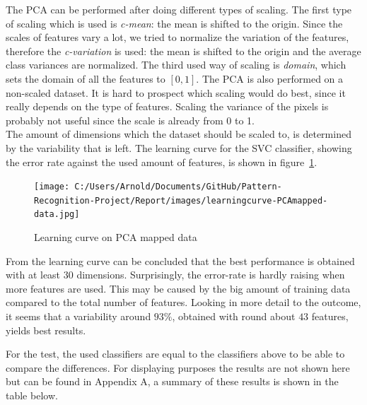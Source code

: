 \documentclass{article}
\begin{document}
The PCA can be performed after doing different types of scaling. The first type of scaling which is used is \emph{c-mean}: the mean is shifted to the origin. Since the scales of features vary a lot, we tried to normalize the variation of the features, therefore the \emph{c-variation} is used: the mean is shifted to the origin and the average class variances are normalized. The third used way of scaling is \emph{domain}, which sets the domain of all the features to $[0, 1]$. The PCA is also performed on a non-scaled dataset. It is hard to prospect which scaling would do best, since it really depends on the type of features. Scaling the variance of the pixels is probably not useful since the scale is already from 0 to 1. \\

The amount of dimensions which the dataset should be scaled to, is determined by the variability that is left. The learning curve for the SVC classifier, showing the error rate against the used amount of features, is shown in figure~\ref{fig:learningcurve-PCAmapped-data}.

\begin{figure}[H]
	\centering
		\texttt{[image: C:/Users/Arnold/Documents/GitHub/Pattern-Recognition-Project/Report/images/learningcurve-PCAmapped-data.jpg]}
	\caption{Learning curve on PCA mapped data}
	\label{fig:learningcurve-PCAmapped-data}
\end{figure}

From the learning curve can be concluded that the best performance is obtained with at least $30$ dimensions. Surprisingly, the error-rate is hardly raising when more features are used. This may be caused by the big amount of training data compared to the total number of features. Looking in more detail to the outcome, it seems that a variability around $93 \%$, obtained with round about $43$ features, yields best results. 

For the test, the used classifiers are equal to the classifiers above to be able to compare the differences. For displaying purposes the results are not shown here but can be found in Appendix A, a summary of these results is shown in the table below.
\end{document}
